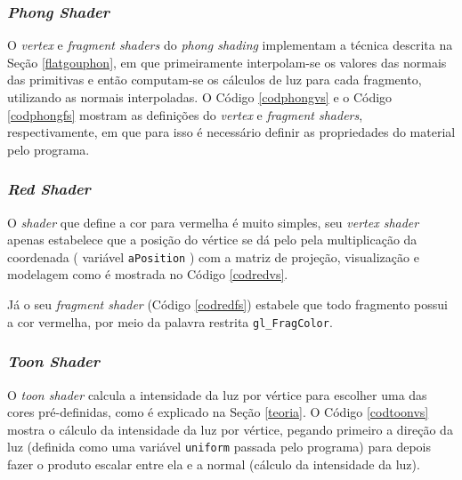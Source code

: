 \subsubsection{\textit{Phong Shader}}

	O \textit{vertex} e \textit{fragment shaders} do \textit{phong shading} implementam a técnica descrita na Seção \ref{flatgouphon}, em que primeiramente interpolam-se os valores das normais das primitivas e então computam-se os cálculos de luz para cada fragmento, utilizando as normais interpoladas. O Código \ref{codphongvs} e o Código \ref{codphongfs} mostram as definições do \textit{vertex} e \textit{fragment shaders}, respectivamente, em que para isso é necessário definir as propriedades do material pelo programa.  

	

	
	
\subsubsection{\textit{Red Shader}}
	
	O \textit{shader} que define a cor para vermelha é muito simples,  seu \textit{vertex shader} apenas estabelece que a posição do vértice  se dá pelo pela multiplicação da coordenada ( variável \texttt{aPosition} ) com a matriz de projeção, visualização e modelagem como é mostrada no Código \ref{codredvs}. 
	
	

	Já o seu \textit{fragment shader} (Código \ref{codredfs}) estabele que todo fragmento possui a cor vermelha, por meio da palavra restrita \texttt{gl\_FragColor}.
	
	

\subsubsection{\textit{Toon Shader}}

	O  \textit{toon shader} calcula a intensidade da luz por vértice para escolher uma das cores pré-definidas, como é explicado na Seção \ref{teoria}. O Código  \ref{codtoonvs} mostra o cálculo da intensidade da luz por vértice, pegando primeiro a direção da luz (definida como uma variável \texttt{uniform} passada pelo programa) para depois fazer o produto escalar entre ela e a normal (cálculo da intensidade da luz).  

